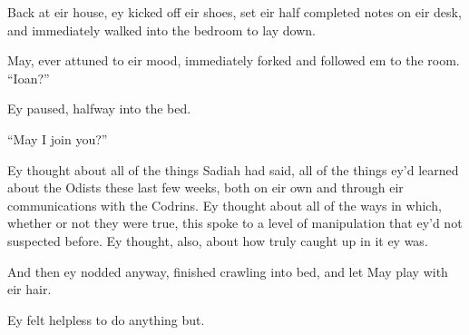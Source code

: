Back at eir house, ey kicked off eir shoes, set eir half completed notes on eir desk, and immediately walked into the bedroom to lay down.

May, ever attuned to eir mood, immediately forked and followed em to the room. ``Ioan?''

Ey paused, halfway into the bed.

``May I join you?''

Ey thought about all of the things Sadiah had said, all of the things ey'd learned about the Odists these last few weeks, both on eir own and through eir communications with the Codrins. Ey thought about all of the ways in which, whether or not they were true, this spoke to a level of manipulation that ey'd not suspected before. Ey thought, also, about how truly caught up in it ey was.

And then ey nodded anyway, finished crawling into bed, and let May play with eir hair.

Ey felt helpless to do anything but.
